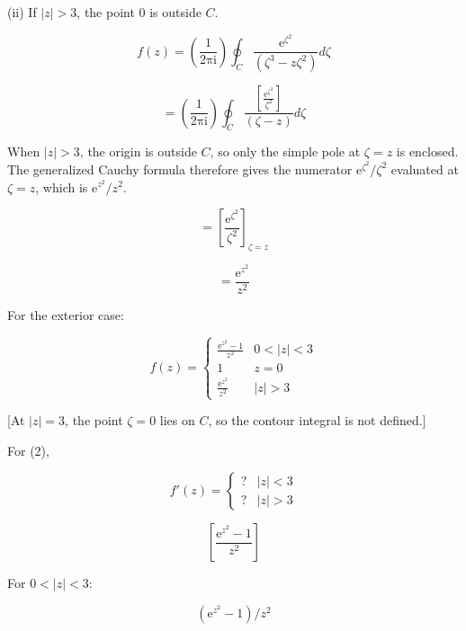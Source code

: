\documentclass[11pt,a4paper]{article}
\theoremstyle{definition}
\theoremstyle{plain}
\begin{document}
(ii) If $\vert{}z\vert{} > 3$, the point 0 is outside $C$.

\begin{equation}
f(z) = \left(\frac{1}{2\mathrm{\pi}\mathrm{i}}\right)\oint_{C}\frac{\mathrm{e}^{\zeta^{2}}}{(\zeta^{3} - z\zeta^{2})}d\zeta
\end{equation}

\[
= \left(\frac{1}{2\mathrm{\pi}\mathrm{i}}\right)\oint_{C}\frac{[\frac{\mathrm{e}^{\zeta^{2}}}{\zeta^{2}}]}{(\zeta - z)}d\zeta
\]

When $\vert{}z\vert{} > 3$, the origin is outside $C$, so only the simple pole at $\zeta = z$ is enclosed. The generalized Cauchy formula therefore gives the numerator $\mathrm{e}^{\zeta^{2}}/\zeta^{2}$ evaluated at $\zeta = z$, which is $\mathrm{e}^{z^{2}}/z^{2}$.

\begin{equation}
= {[\frac{\mathrm{e}^{\zeta^{2}}}{\zeta^{2}}]}_{\zeta = z}
\end{equation}

\[
= \frac{\mathrm{e}^{z^{2}}}{z^{2}}
\]

For the exterior case:

\begin{equation}
f(z) = \begin{cases} \frac{\mathrm{e}^{z^{2}} - 1}{z^{2}} & 0 < \vert{}z\vert{} < 3 \\ 1 & z = 0 \\ \frac{\mathrm{e}^{z^{2}}}{z^{2}} & \vert{}z\vert{} > 3 \end{cases}
\end{equation}

[At $\vert{}z\vert{} = 3$, the point $\zeta = 0$ lies on $C$, so the contour integral is not defined.]

For (2),

\begin{equation}
f'(z) = \begin{cases} ? & \vert{}z\vert{} < 3 \\ ? & \vert{}z\vert{} > 3 \end{cases}
\end{equation}

\[
\left[\frac{\mathrm{e}^{z^{2}} - 1}{z^{2}}\right]
\]

For $0 < \vert{}z\vert{} < 3$:

\begin{equation}
(\mathrm{e}^{z^{2}} - 1)/z^{2}
\end{equation}
\end{document}
